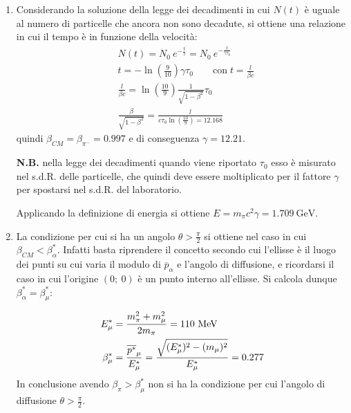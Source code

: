\documentclass[12pt,twoside,a4]{article}
\begin{document}
\newpage
\begin{solution}
\vspace{-1cm}
	\begin{enumerate}[label=(\textit{\roman*})]
		\item Considerando la soluzione della legge dei decadimenti in cui $N(t)$ è uguale al numero di particelle che ancora non sono decadute, si ottiene una relazione in cui il tempo è in funzione della velocità:
		\begin{align*}
	    & N(t) = N_0 \ e^{-\frac{t}{\tau}} = N_0 \ e^{-\frac{t}{\gamma \tau_0}} \\
	    & t = -\ln{\left( \frac{9}{10}\right)} \gamma \tau_0 \qquad \text{con} \; t = \frac{l}{\beta c} \\
	    & \frac{l}{\beta c } = \ln\left({\frac{10}{9}}\right) \frac{1}{\sqrt{1-\beta^2}} \tau_0  \\
	    & \frac{\beta}{\sqrt{1-\beta^2}} = \frac{l}{c \tau_{0} \ln \left(\frac{10}{9}\right) = 12.168} 
	   	\end{align*}
	quindi $\beta_{CM} = \beta_{\pi^-} = 0.997$ e di conseguenza $\gamma = 12.21$.
		 
	\noindent \textbf{N.B.} nella legge dei decadimenti quando viene riportato $\tau_0$ esso è misurato nel s.d.R. delle particelle, che quindi deve essere moltiplicato per il fattore $\gamma$ per spostarsi nel s.d.R. del laboratorio.
		
	Applicando la definizione di energia si ottiene $E = m_\pi c^2 \gamma = 1.709 \ \mathrm{GeV}$.
	
	\item La condizione per cui si ha un angolo $\theta > \frac{\pi}{2}$ si ottiene nel caso in cui $\beta_{CM} < \beta^\ast_\alpha$. Infatti basta riprendere il concetto secondo cui l'ellisse è il luogo dei punti su cui varia il modulo di $\overline{p}_\alpha$ e l'angolo di diffusione, e ricordarsi il caso in cui l'origine $(0;\ 0)$ è un punto interno all'ellisse. Si calcola dunque $\beta^\ast_\alpha = \beta^\ast_\mu$:
	
	\begin{align*}
		E^\ast_\mu &= \frac{m^2_\pi + m^2_\mu}{2 m_\pi} = 110 \ \mathrm{MeV} \\
	    \beta^\ast_\mu &= \frac{\overline{p^\ast}_\mu}{E^\ast_\mu} = \frac{\sqrt{(E^\ast_\mu)^2 - (m_\mu)^2}}{E^\ast_\mu} = 0.277
	\end{align*}	
	In conclusione avendo $\beta_\pi > \beta^\ast_\mu$ non si ha la condizione per cui l'angolo di diffusione $\theta > \frac{\pi}{2}$.
\end{enumerate}

\end{solution}
 
\end{document}
